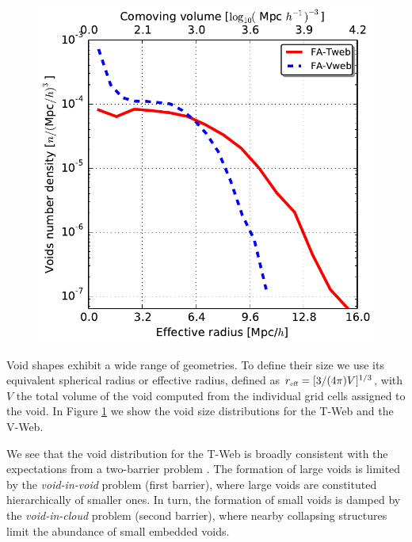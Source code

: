 \documentclass[a4,useAMS,usenatbib,usegraphicx]{mn2e}
\newcommand{\reff}{{\ifmmode{r_{\mbox{\tiny eff}}}\else{$r_{\mbox{\tiny eff}}$}\fi}}
\begin{document}
\begin{figure}
\centering

  \includegraphics[trim = 0mm 0mm 0mm 0mm, clip, keepaspectratio=true,
  width=0.35\textheight]{voids_regions_volume_all.pdf}


  \label{fig:volume_function}

\end{figure}


Void shapes exhibit a wide range of geometries.
To define their size we use its equivalent spherical radius or
effective radius, defined as $\reff = [3/(4\pi)V]^{1/3}$, with $V$ the 
total volume of the void computed from the individual grid cells
assigned to the void.   
In Figure \ref{fig:volume_function} we show the void size
distributions for the T-Web and the V-Web.

We see that the void distribution for the T-Web is broadly consistent with the
expectations from a two-barrier problem  \citep{Sheth04}. 
The formation of large voids is limited by the \textit{void-in-void}
problem (first barrier), where large voids are constituted
hierarchically of smaller ones. 
In turn, the formation of small voids is damped by the
\textit{void-in-cloud} problem (second barrier),  where nearby
collapsing structures limit the abundance of small embedded voids. 
\end{document}
